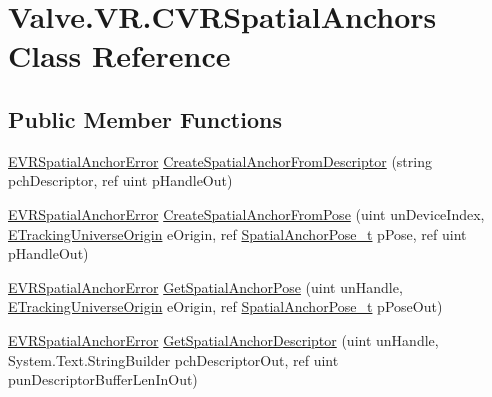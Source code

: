 \hypertarget{class_valve_1_1_v_r_1_1_c_v_r_spatial_anchors}{}\section{Valve.\+V\+R.\+C\+V\+R\+Spatial\+Anchors Class Reference}
\label{class_valve_1_1_v_r_1_1_c_v_r_spatial_anchors}
\subsection*{Public Member Functions}
\begin{DoxyCompactItemize}
\item 
\mbox{\hyperlink{namespace_valve_1_1_v_r_ab0aeb9b02c0851286deb0b4134b220d4}{E\+V\+R\+Spatial\+Anchor\+Error}} \mbox{\hyperlink{class_valve_1_1_v_r_1_1_c_v_r_spatial_anchors_a28df315963af7b56839bb678b0d585b3}{Create\+Spatial\+Anchor\+From\+Descriptor}} (string pch\+Descriptor, ref uint p\+Handle\+Out)
\item 
\mbox{\hyperlink{namespace_valve_1_1_v_r_ab0aeb9b02c0851286deb0b4134b220d4}{E\+V\+R\+Spatial\+Anchor\+Error}} \mbox{\hyperlink{class_valve_1_1_v_r_1_1_c_v_r_spatial_anchors_af69ea6f251152cba2279b246188d6e98}{Create\+Spatial\+Anchor\+From\+Pose}} (uint un\+Device\+Index, \mbox{\hyperlink{namespace_valve_1_1_v_r_a29be99a3c2f780157bd490db06a7f12f}{E\+Tracking\+Universe\+Origin}} e\+Origin, ref \mbox{\hyperlink{struct_valve_1_1_v_r_1_1_spatial_anchor_pose__t}{Spatial\+Anchor\+Pose\+\_\+t}} p\+Pose, ref uint p\+Handle\+Out)
\item 
\mbox{\hyperlink{namespace_valve_1_1_v_r_ab0aeb9b02c0851286deb0b4134b220d4}{E\+V\+R\+Spatial\+Anchor\+Error}} \mbox{\hyperlink{class_valve_1_1_v_r_1_1_c_v_r_spatial_anchors_af537aeab54825d30f8b7b377edce25bf}{Get\+Spatial\+Anchor\+Pose}} (uint un\+Handle, \mbox{\hyperlink{namespace_valve_1_1_v_r_a29be99a3c2f780157bd490db06a7f12f}{E\+Tracking\+Universe\+Origin}} e\+Origin, ref \mbox{\hyperlink{struct_valve_1_1_v_r_1_1_spatial_anchor_pose__t}{Spatial\+Anchor\+Pose\+\_\+t}} p\+Pose\+Out)
\item 
\mbox{\hyperlink{namespace_valve_1_1_v_r_ab0aeb9b02c0851286deb0b4134b220d4}{E\+V\+R\+Spatial\+Anchor\+Error}} \mbox{\hyperlink{class_valve_1_1_v_r_1_1_c_v_r_spatial_anchors_af010b477e2a6eb63b4a4c2a4258f3e87}{Get\+Spatial\+Anchor\+Descriptor}} (uint un\+Handle, System.\+Text.\+String\+Builder pch\+Descriptor\+Out, ref uint pun\+Descriptor\+Buffer\+Len\+In\+Out)
\end{DoxyCompactItemize}


